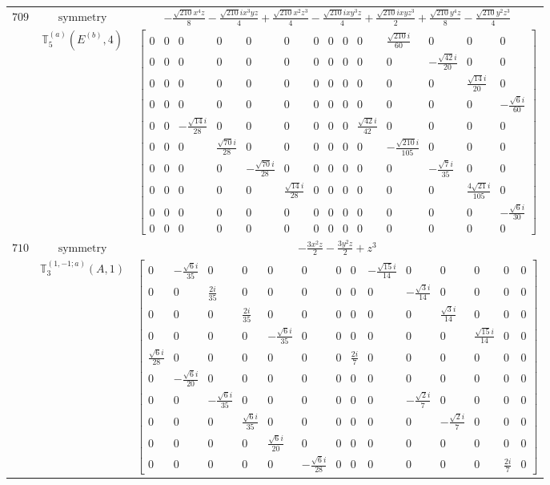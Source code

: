 \documentclass[fleqn,8pt,landscape]{jsarticle}
\begin{document}
\begin{longtable}{ccc}
$ 709 $ & $ \text{symmetry} $ & $ - \frac{\sqrt{210} x^{4} z}{8} - \frac{\sqrt{210} i x^{3} y z}{4} + \frac{\sqrt{210} x^{2} z^{3}}{4} - \frac{\sqrt{210} i x y^{3} z}{4} + \frac{\sqrt{210} i x y z^{3}}{2} + \frac{\sqrt{210} y^{4} z}{8} - \frac{\sqrt{210} y^{2} z^{3}}{4} $ \\
$  $ & $ \mathbb{T}_{5}^{(a)}(E^{(b)},4) $ & $ \begin{bmatrix} 0 & 0 & 0 & 0 & 0 & 0 & 0 & 0 & 0 & 0 & \frac{\sqrt{210} i}{60} & 0 & 0 & 0 \\ 0 & 0 & 0 & 0 & 0 & 0 & 0 & 0 & 0 & 0 & 0 & - \frac{\sqrt{42} i}{20} & 0 & 0 \\ 0 & 0 & 0 & 0 & 0 & 0 & 0 & 0 & 0 & 0 & 0 & 0 & \frac{\sqrt{14} i}{20} & 0 \\ 0 & 0 & 0 & 0 & 0 & 0 & 0 & 0 & 0 & 0 & 0 & 0 & 0 & - \frac{\sqrt{6} i}{60} \\ 0 & 0 & - \frac{\sqrt{14} i}{28} & 0 & 0 & 0 & 0 & 0 & 0 & \frac{\sqrt{42} i}{42} & 0 & 0 & 0 & 0 \\ 0 & 0 & 0 & \frac{\sqrt{70} i}{28} & 0 & 0 & 0 & 0 & 0 & 0 & - \frac{\sqrt{210} i}{105} & 0 & 0 & 0 \\ 0 & 0 & 0 & 0 & - \frac{\sqrt{70} i}{28} & 0 & 0 & 0 & 0 & 0 & 0 & - \frac{\sqrt{7} i}{35} & 0 & 0 \\ 0 & 0 & 0 & 0 & 0 & \frac{\sqrt{14} i}{28} & 0 & 0 & 0 & 0 & 0 & 0 & \frac{4 \sqrt{21} i}{105} & 0 \\ 0 & 0 & 0 & 0 & 0 & 0 & 0 & 0 & 0 & 0 & 0 & 0 & 0 & - \frac{\sqrt{6} i}{30} \\ 0 & 0 & 0 & 0 & 0 & 0 & 0 & 0 & 0 & 0 & 0 & 0 & 0 & 0 \end{bmatrix} $ \\ \hline
$ 710 $ & $ \text{symmetry} $ & $ - \frac{3 x^{2} z}{2} - \frac{3 y^{2} z}{2} + z^{3} $ \\
$  $ & $ \mathbb{T}_{3}^{(1,-1;a)}(A,1) $ & $ \begin{bmatrix} 0 & - \frac{\sqrt{6} i}{35} & 0 & 0 & 0 & 0 & 0 & 0 & - \frac{\sqrt{15} i}{14} & 0 & 0 & 0 & 0 & 0 \\ 0 & 0 & \frac{2 i}{35} & 0 & 0 & 0 & 0 & 0 & 0 & - \frac{\sqrt{3} i}{14} & 0 & 0 & 0 & 0 \\ 0 & 0 & 0 & \frac{2 i}{35} & 0 & 0 & 0 & 0 & 0 & 0 & \frac{\sqrt{3} i}{14} & 0 & 0 & 0 \\ 0 & 0 & 0 & 0 & - \frac{\sqrt{6} i}{35} & 0 & 0 & 0 & 0 & 0 & 0 & \frac{\sqrt{15} i}{14} & 0 & 0 \\ \frac{\sqrt{6} i}{28} & 0 & 0 & 0 & 0 & 0 & 0 & \frac{2 i}{7} & 0 & 0 & 0 & 0 & 0 & 0 \\ 0 & - \frac{\sqrt{6} i}{20} & 0 & 0 & 0 & 0 & 0 & 0 & 0 & 0 & 0 & 0 & 0 & 0 \\ 0 & 0 & - \frac{\sqrt{6} i}{35} & 0 & 0 & 0 & 0 & 0 & 0 & - \frac{\sqrt{2} i}{7} & 0 & 0 & 0 & 0 \\ 0 & 0 & 0 & \frac{\sqrt{6} i}{35} & 0 & 0 & 0 & 0 & 0 & 0 & - \frac{\sqrt{2} i}{7} & 0 & 0 & 0 \\ 0 & 0 & 0 & 0 & \frac{\sqrt{6} i}{20} & 0 & 0 & 0 & 0 & 0 & 0 & 0 & 0 & 0 \\ 0 & 0 & 0 & 0 & 0 & - \frac{\sqrt{6} i}{28} & 0 & 0 & 0 & 0 & 0 & 0 & \frac{2 i}{7} & 0 \end{bmatrix} $ \\ \hline

\end{longtable}
\end{document}
